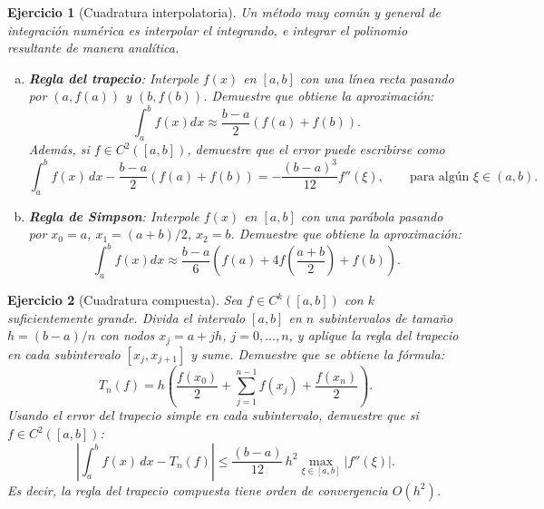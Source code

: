 \documentclass[12pt]{article}
\newtheorem{exercise}{Ejercicio}
\begin{document}
\begin{exercise}[Cuadratura interpolatoria] Un método muy común y general de integración numérica es interpolar el integrando, e integrar el polinomio resultante de manera analítica.
\begin{enumerate}[(a)]
\item \textbf{Regla del trapecio}: Interpole $f(x)$ en $[a, b]$ con una línea recta pasando por $(a, f(a))$ y $(b, f(b))$. Demuestre que obtiene la aproximación:
\[
\int_a^b f(x) dx \approx \frac{b-a}{2}(f(a) + f(b)).
\]
Además, si $f\in C^2([a,b])$, demuestre que el error puede escribirse como
\[
\int_a^b f(x)\,dx-\frac{b-a}{2}(f(a)+f(b))=-\frac{(b-a)^3}{12}f''(\xi), \qquad \text{para algún } \xi\in(a,b).
\]
\item \textbf{Regla de Simpson}: Interpole $f(x)$ en $[a, b]$ con una parábola pasando por $x_0 = a$, $x_1 = (a+b)/2$, $x_2 = b$. Demuestre que obtiene la aproximación:
\[
\int_a^b f(x) dx \approx \frac{b-a}{6}\left(f(a) + 4f\left(\frac{a+b}{2}\right) + f(b)\right).
\]
\end{enumerate}
\end{exercise}

\begin{exercise}[Cuadratura compuesta]
Sea $f\in C^k([a,b])$ con $k$ suficientemente grande. Divida el intervalo $[a,b]$ en $n$ subintervalos de tamaño $h = (b-a)/n$ con nodos $x_j = a + jh$, $j = 0, \ldots, n$, y aplique la regla del trapecio en cada subintervalo $[x_j, x_{j+1}]$ y sume. Demuestre que se obtiene la fórmula:
\[
T_n(f) = h\left(\frac{f(x_0)}{2} + \sum_{j=1}^{n-1} f(x_j) + \frac{f(x_n)}{2}\right).
\]
Usando el error del trapecio simple en cada subintervalo, demuestre que si $f\in C^2([a,b])$:
\[
\left|\int_a^b f(x)\,dx - T_n(f)\right| \leq \frac{(b-a)}{12}\,h^2 \max_{\xi\in[a,b]}|f''(\xi)|.
\]
Es decir, la regla del trapecio compuesta tiene orden de convergencia $O(h^2)$.
\end{exercise}
\end{document}
